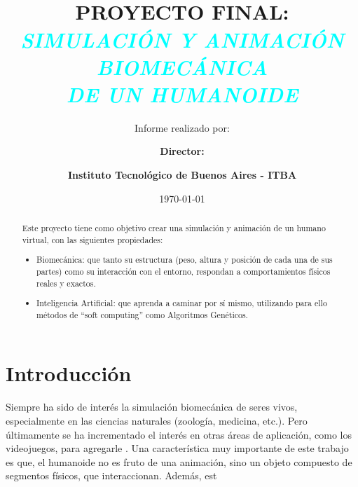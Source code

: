 \documentclass{article}
\title{\textbf{\\PROYECTO FINAL: \\ \vspace*{2ex} \textcolor{cyan}{\textit{SIMULACI\'ON Y ANIMACI\'ON BIOMEC\'ANICA \\DE UN HUMANOIDE}  }  \vspace*{3ex}} } %
\author{Informe realizado por: }
\affil{Altamiranda Graterol, Enzo\\%
\url{ealtamir@itba.edu.ar}}
\affil{Fontanella De Santis, Teresa\\
\url{tfontane@itba.edu.ar}}
\affil{Mehdi, Tom\'as\\
\url{tmehdi@itba.edu.ar}\vspace*{3ex}}
\author{\textbf{Director:}}
\affil{ \textbf{Dr. PARISI, Daniel Ricardo} \vspace*{3ex}}
\date{\today} %
\author{\textbf{Instituto Tecnol\'ogico de Buenos Aires - ITBA} }
\affil{\vspace*{3ex}}
\begin{document}

\maketitle %
\thispagestyle{empty} %

\newpage
\tableofcontents
\newpage

 \begin{abstract}
 
\noindent

\begin{adjustwidth}{1.05cm}{0cm}
Este proyecto tiene como objetivo crear una simulaci\'on y animaci\'on de un humano virtual, con las siguientes propiedades:
\begin{itemize}[leftmargin=5.5mm]
\item Biomec\'anica: que tanto su estructura (peso, altura y posici\'on de cada una de sus partes) como su interacci\'on con el entorno, respondan a comportamientos f\'isicos reales y exactos.
\item Inteligencia Artificial: que aprenda a caminar por s\'i mismo, utilizando para ello m\'etodos de ``soft computing'' como Algoritmos Gen\'eticos.
\end{itemize}

\end{adjustwidth}

 \end{abstract}



\section{Introducci\'on}

\begin{adjustwidth}{1cm}{0cm}
Siempre ha sido de inter\'es la simulaci\'on biomec\'anica de seres vivos, especialmente en las ciencias naturales (zoolog\'ia, medicina, etc.). Pero \'ultimamente se ha incrementado el inter\'es en otras \'areas de aplicaci\'on, como los videojuegos, para agregarle  .
Una caracter\'istica muy importante de este trabajo es que, el humanoide no es fruto de una animaci\'on, sino  un objeto compuesto de segmentos f\'isicos, que interaccionan. Adem\'as, est  
\end{adjustwidth}
\end{document}
